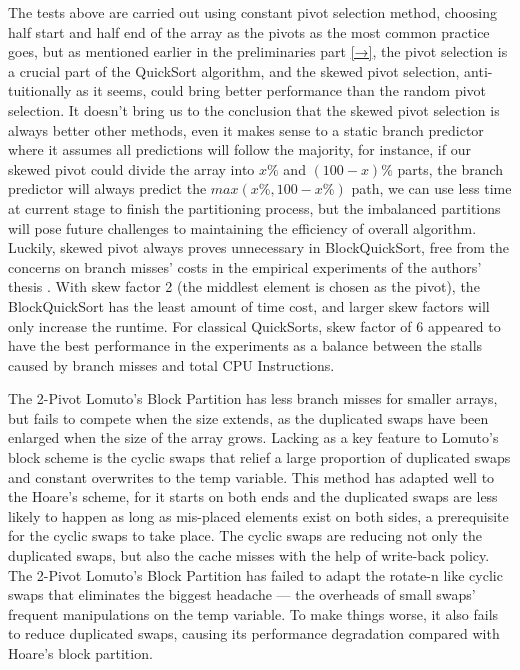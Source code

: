 \documentclass[a4paper,oneside,12pt]{book}
\begin{document}
The tests above are carried out using constant pivot selection method, choosing half start and half end of the array as the pivots as the most common practice goes,
but as mentioned earlier in the preliminaries part \hyperlink{ref:AnalysisOfBranchMissesInQuickSort}{[→]}, the pivot selection is a crucial part of the QuickSort algorithm, and the skewed pivot selection, anti-tuitionally as it seems, could bring better performance than the random pivot selection.
It doesn't bring us to the conclusion that the skewed pivot selection is always better other methods, even it makes sense to a static branch predictor where it assumes all predictions will follow the majority, for instance, if our skewed pivot could divide the array into $x\%$ and $(100-x)\%$ parts, the branch predictor will always predict the $max(x\%, 100-x\%)$ path,
we can use less time at current stage to finish the partitioning process, but the imbalanced partitions will pose future challenges to maintaining the efficiency of overall algorithm. \hypertarget{UnnecessarySkewed}{}Luckily, skewed pivot always proves unnecessary in BlockQuickSort, free from the concerns on branch misses' costs in the empirical experiments of the authors' thesis \cite{BlockQuickSort}. With skew factor 2 (the middlest element is chosen as the pivot), the BlockQuickSort has the least amount of time cost, and larger skew factors will only increase the runtime.
For classical QuickSorts, skew factor of 6 appeared to have the best performance in the experiments as a balance between the stalls caused by branch misses and total CPU Instructions.

The 2-Pivot Lomuto's Block Partition has less branch misses for smaller arrays, but fails to compete when the size extends, as the duplicated swaps have been enlarged when the size of the array grows. 
Lacking as a key feature to Lomuto's block scheme is the cyclic swaps that relief a large proportion of duplicated swaps and constant overwrites to the temp variable. This method has adapted well to the Hoare's scheme, for it starts on both ends and the duplicated swaps are less likely to happen as long as mis-placed elements exist on both sides, a prerequisite for the cyclic swaps to take place.
The cyclic swaps are reducing not only the duplicated swaps, but also the cache misses with the help of write-back policy. The 2-Pivot Lomuto's Block Partition has failed to adapt the rotate-n like cyclic swaps that eliminates the biggest headache --- the overheads of small swaps' frequent manipulations on the temp variable. To make things worse, it also fails to reduce duplicated swaps, causing its performance degradation compared with Hoare's block partition. %
\end{document}
